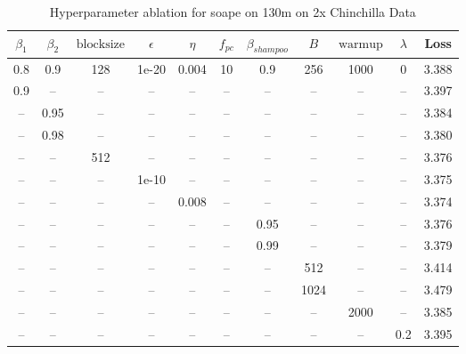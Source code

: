 \begin{table}[h!]
\centering
\caption{Hyperparameter ablation for soape on 130m on 2x Chinchilla Data}
\label{tab:ablation_soape_130m_on_2x_chinchilla_data}
\begin{tabular}{ccccccccccc}
\toprule
$\beta_1$ & $\beta_2$ & $\mathrm{block size}$ & $\epsilon$ & $\eta$ & $f_{pc}$ & $\beta_{shampoo}$ & $B$ & $\mathrm{warmup}$ & $\lambda$ & Loss \\
\midrule
0.8 & 0.9 & 128 & 1e-20 & 0.004 & 10 & 0.9 & 256 & 1000 & 0 & 3.388 \\
\midrule
0.9 & -- & -- & -- & -- & -- & -- & -- & -- & -- & 3.397 \\
-- & 0.95 & -- & -- & -- & -- & -- & -- & -- & -- & 3.384 \\
-- & 0.98 & -- & -- & -- & -- & -- & -- & -- & -- & 3.380 \\
-- & -- & 512 & -- & -- & -- & -- & -- & -- & -- & 3.376 \\
-- & -- & -- & 1e-10 & -- & -- & -- & -- & -- & -- & 3.375 \\
-- & -- & -- & -- & 0.008 & -- & -- & -- & -- & -- & 3.374 \\
-- & -- & -- & -- & -- & -- & 0.95 & -- & -- & -- & 3.376 \\
-- & -- & -- & -- & -- & -- & 0.99 & -- & -- & -- & 3.379 \\
-- & -- & -- & -- & -- & -- & -- & 512 & -- & -- & 3.414 \\
-- & -- & -- & -- & -- & -- & -- & 1024 & -- & -- & 3.479 \\
-- & -- & -- & -- & -- & -- & -- & -- & 2000 & -- & 3.385 \\
-- & -- & -- & -- & -- & -- & -- & -- & -- & 0.2 & 3.395 \\
\bottomrule
\end{tabular}
\end{table}

